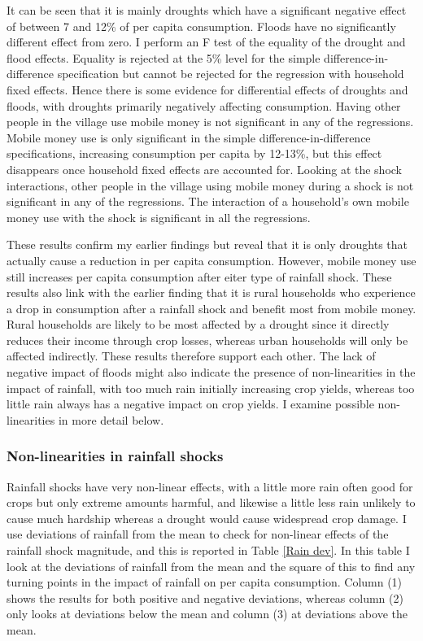 It can be seen that it is mainly droughts which have a significant negative effect of between 7 and 12\% of per capita consumption. Floods have no significantly different effect from zero. I perform an F test of the equality of the drought and flood effects. Equality is rejected at the 5\% level  for the simple difference-in-difference specification but cannot be rejected for the regression with household fixed effects. Hence there is some evidence for differential effects of droughts and floods, with droughts primarily negatively affecting consumption. Having other people in the village use mobile money is not significant in any of the regressions. Mobile money use is only significant in the simple difference-in-difference specifications, increasing consumption per capita by 12-13\%, but this effect disappears once household fixed effects are accounted for. Looking at the shock interactions, other people in the village using mobile money during a shock is not significant in any of the regressions. The interaction of a household's own mobile money use with the shock is significant in all the regressions. 

These results confirm my earlier findings but reveal that it is only droughts that actually cause a reduction in per capita consumption. However, mobile money use still increases per capita consumption after eiter type of rainfall shock. These results also link with the earlier finding that it is rural households who experience a drop in consumption after a rainfall shock and benefit most from mobile money. Rural households are likely to be most affected by a drought since it directly reduces their income through crop losses, whereas urban households will only be affected indirectly. These results therefore support each other. The lack of negative impact of floods might also indicate the presence of non-linearities in the impact of rainfall, with too much rain initially increasing crop yields, whereas too little rain always has a negative impact on crop yields. I examine possible non-linearities in more detail below.



\subsubsection{Non-linearities in rainfall shocks}
Rainfall shocks have very non-linear effects, with a little more rain often good for crops but only extreme amounts harmful, and likewise a little less rain unlikely to cause much hardship whereas a drought would cause widespread crop damage. I use deviations of rainfall from the mean to check for non-linear effects of the rainfall shock magnitude, and this is reported in Table \ref{Rain dev}. In this table I look at the deviations of rainfall from the mean and the square of this to find any turning points in the impact of rainfall on per capita consumption. Column (1) shows the results for both positive and negative deviations, whereas column (2) only looks at deviations below the mean and column (3) at deviations above the mean. 

